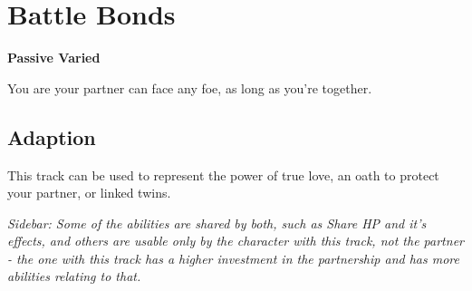 \section{Battle Bonds}
\textbf{Passive Varied}

You are your partner can face any foe, as long as you’re together.

\subsection*{Adaption}
This track can be used to represent the power of true love, an oath to protect your partner, or linked twins. 

\emph{Sidebar: Some of the abilities are shared by both, such as Share HP and it’s effects, and others are usable only by the character with this track, not the partner - the one with this track has a higher investment in the partnership and has more abilities relating to that.}

